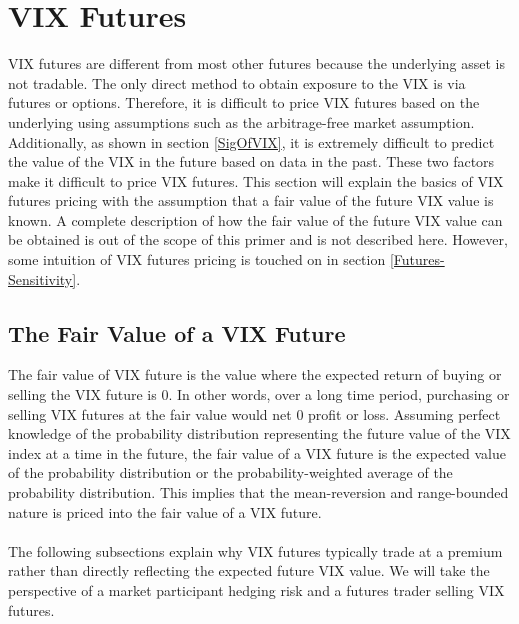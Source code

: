 \documentclass[11pt, oneside]{book}
\begin{document}
\section{VIX Futures} \label{Futures-VIXFuts}
VIX futures are different from most other futures because the underlying asset is not tradable. The only direct method to obtain exposure to the VIX is via futures or options. Therefore, it is difficult to price VIX futures based on the underlying using assumptions such as the arbitrage-free market assumption. Additionally, as shown in section \ref{SigOfVIX}, it is extremely difficult to predict the value of the VIX in the future based on data in the past. These two factors make it difficult to price VIX futures. This section will explain the basics of VIX futures pricing with the assumption that a fair value of the future VIX value is known. A complete description of how the fair value of the future VIX value can be obtained is out of the scope of this primer and is not described here. However, some intuition of VIX futures pricing is touched on in section \ref{Futures-Sensitivity}.

\subsection{The Fair Value of a VIX Future} \label{Futures-VIXFuts-Fair}
The fair value of VIX future is the value where the expected return of buying or selling the VIX future is 0. In other words, over a long time period, purchasing or selling VIX futures at the fair value would net 0 profit or loss. Assuming perfect knowledge of the probability distribution representing the future value of the VIX index at a time in the future, the fair value of a VIX future is the expected value of the probability distribution or the probability-weighted average of the probability distribution. This implies that the mean-reversion and range-bounded nature is priced into the fair value of a VIX future.
\\
\\
The following subsections explain why VIX futures typically trade at a premium rather than directly reflecting the expected future VIX value. We will take the perspective of a market participant hedging risk and a futures trader selling VIX futures.
\end{document}
